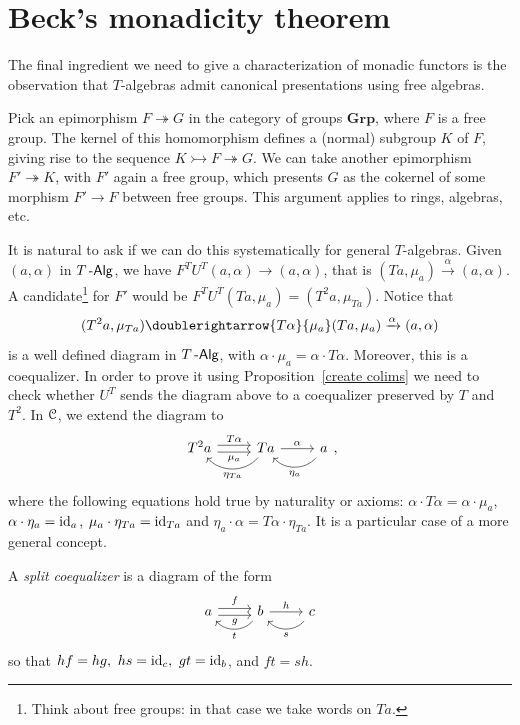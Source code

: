 \documentclass[a4paper,11pt,oneside,openany]{scrbook}
\begin{document}
\section{Beck’s monadicity theorem}

The final ingredient we need to give a characterization of monadic functors is the observation that $T$-algebras admit canonical presentations using free algebras.

\begin{exmp}
	Pick an epimorphism $F\twoheadrightarrow G$ in the category of groups $\mathbf{Grp}$, where $F$ is a free group. The kernel of this homomorphism defines a (normal) subgroup $K$ of $F$, giving rise to the sequence $K\rightarrowtail F\twoheadrightarrow G$. We can take another epimorphism $F'\twoheadrightarrow K$, with $F'$ again a free group, which presents $G$ as the cokernel of some morphism $F'\to F$ between free groups. This argument applies to rings, algebras, etc.
\end{exmp}

It is natural to ask if we can do this systematically for general $T$-algebras. Given $(a,\alpha)$ in $T\operatorname{-\mathsf{Alg}}$, we have $F^TU^T(a,\alpha)\to(a,\alpha)$, that is $(Ta,\mu_a)\xrightarrow{\alpha}(a,\alpha)$. A candidate\footnote{Think about free groups: in that case we take words on $Ta$.} for $F'$ would be $F^TU^T(Ta, \mu_a)=(T^2a, \mu_{Ta})$. Notice that
\[
	(T^2a,\mu_{Ta}) \doublerightarrow{T\alpha}{\mu_a}(Ta,\mu_a)\xrightarrow{\alpha}(a,\alpha)
\]
is a well defined diagram in $T\operatorname{-\mathsf{Alg}}$, with $\alpha\cdot\mu_a=\alpha\cdot
	T\alpha$. Moreover, this is a coequalizer. In order to prove it using
Proposition~\ref{create colims} we need to check whether $U^T$
sends the diagram above to a coequalizer preserved by $T$ and $T^2$. In $\operatorname{\mathcal{C}}$,
we extend the diagram to
\[
	\begin{tikzcd}
		T^2a\arrow[r, shift left, "T\alpha"] \arrow[r, shift right, "\mu_a"']
		&Ta  \arrow[r, "\alpha"] \arrow[l, bend left=49, swap, "\eta_{Ta}"'] & a \arrow[l, bend left=49, swap, "\eta_a"']
	\end{tikzcd}
	,\]
where the following equations hold true by naturality or axioms: $\alpha\cdot
	T\alpha=\alpha\cdot\mu_a$, $\alpha\cdot\eta_a=\operatorname{id}_a$,
$\mu_a\cdot\eta_{Ta}=\operatorname{id}_{Ta}$ and
$\eta_a\cdot\alpha=T\alpha\cdot\eta_{Ta}$. It is a particular case of a
more general concept.
\begin{defn}
	A \emph{split coequalizer} is a diagram of the form
	\vspace*{-2.4mm}
	\[
		\begin{tikzcd}[ampersand replacement=\&]
			a\arrow[r, shift left, "f"] \arrow[r, shift right, "g"']
			\& b \arrow[r, "h"] \arrow[l, bend left=49, "t"] \& c \arrow[l, bend left=49, "s"]
		\end{tikzcd}
	\]
	so that $hf=hg,\ hs=\id_c,\ gt=\id_b$, and $ft=sh$.
\end{defn}
\end{document}
